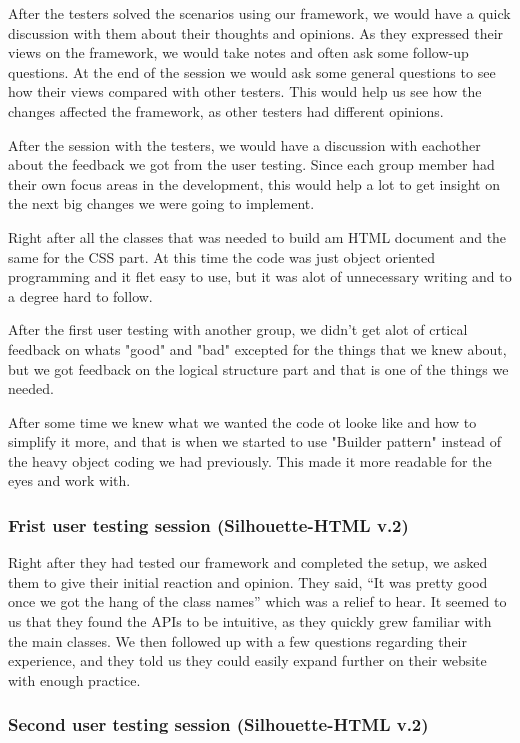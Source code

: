 \documentclass[12pt]{article}
\begin{document}
    After the testers solved the scenarios using our framework, we would have a quick discussion with them about their thoughts and opinions. As they expressed their views on the framework, we would take notes and often ask some follow-up questions. At the end of the session we would ask some general questions to see how their views compared with other testers. This would help us see how the changes affected the framework, as other testers had different opinions.

    After the session with the testers, we would have a discussion with eachother about the feedback we got from the user testing. Since each group member had their own focus areas in the development, this would help a lot to get insight on the next big changes we were going to implement. 

    Right after all the classes that was needed to build am HTML document and the same for the CSS part. At this time the code was just object oriented programming and it flet easy to use, but it was alot of unnecessary writing and to a degree hard to follow.   
        
    After the first user testing with another group, we didn't get alot of crtical feedback on whats "good" and "bad" excepted for the things that we knew about, but we got feedback on the logical structure part and that is one of the things we needed.
        
    After some time we knew what we wanted the code ot looke like and how to simplify it more, and that is when we started to use "Builder pattern" instead of the heavy object coding we had previously. This made it more readable for the eyes and work with.

        \subsubsection{Frist user testing session (Silhouette-HTML v.2)}

        Right after they had tested our framework and completed the setup, we asked them to give their initial reaction and opinion. They said, “It was pretty good once we got the hang of the class names” which was a relief to hear. It seemed to us that they found the APIs to be intuitive, as they quickly grew familiar with the main classes. We then followed up with a few questions regarding their experience, and they told us they could easily expand further on their website with enough practice.

        \subsubsection{Second user testing session (Silhouette-HTML v.2)}
\end{document}
